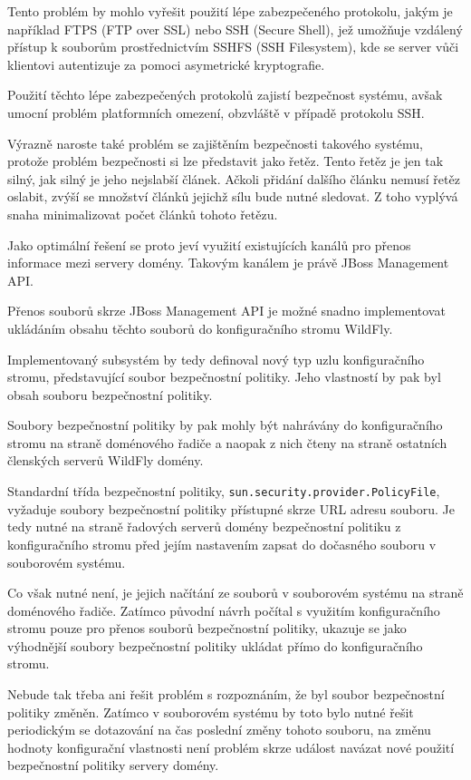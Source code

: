 Tento problém by mohlo vyřešit použití lépe zabezpečeného protokolu, jakým je například FTPS (FTP over SSL) nebo SSH (Secure Shell), jež umožňuje vzdálený přístup k souborům prostřednictvím SSHFS (SSH Filesystem), kde se server vůči klientovi autentizuje za pomoci asymetrické kryptografie. \cite[3]{ssh}

Použití těchto lépe zabezpečených protokolů zajistí bezpečnost systému, avšak umocní problém platformních omezení, obzvláště v případě protokolu SSH.

Výrazně naroste také problém se zajištěním bezpečnosti takového systému, protože problém bezpečnosti si lze představit jako řetěz.
Tento řetěz je jen tak silný, jak silný je jeho nejslabší článek.
Ačkoli přidání dalšího článku nemusí řetěz oslabit, zvýší se množství článků jejichž sílu bude nutné sledovat.
Z toho vyplývá snaha minimalizovat počet článků tohoto řetězu.

Jako optimální řešení se proto jeví využití existujících kanálů pro přenos informace mezi servery domény.
Takovým kanálem je právě JBoss Management API.

Přenos souborů skrze JBoss Management API je možné snadno implementovat ukládáním obsahu těchto souborů do konfiguračního stromu WildFly.

Implementovaný subsystém by tedy definoval nový typ uzlu konfiguračního stromu, představující soubor bezpečnostní politiky. Jeho vlastností by pak byl obsah souboru bezpečnostní politiky.

Soubory bezpečnostní politiky by pak mohly být nahrávány do konfiguračního stromu na straně doménového řadiče a naopak z nich čteny na straně ostatních členských serverů WildFly domény.

Standardní třída bezpečnostní politiky, {\tt sun.security.provider.PolicyFile}, vyžaduje soubory bezpečnostní politiky přístupné skrze URL adresu souboru.
Je tedy nutné na straně řadových serverů domény bezpečnostní politiku z konfiguračního stromu před jejím nastavením zapsat do dočasného souboru v souborovém systému.

Co však nutné není, je jejich načítání ze souborů v souborovém systému na straně doménového řadiče. Zatímco původní návrh počítal s využitím konfiguračního stromu pouze pro přenos souborů bezpečnostní politiky, ukazuje se jako výhodnější soubory bezpečnostní politiky ukládat přímo do konfiguračního stromu.

Nebude tak třeba ani řešit problém s rozpoznáním, že byl soubor bezpečnostní politiky změněn. Zatímco v souborovém systému by toto bylo nutné řešit periodickým se dotazování na čas poslední změny tohoto souboru, na změnu hodnoty konfigurační vlastnosti není problém skrze událost navázat nové použití bezpečnostní politiky servery domény.

